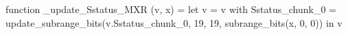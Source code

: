 function _update_Sstatus_MXR (v, x) = let v = { v with Sstatus_chunk_0 = update_subrange_bits(v.Sstatus_chunk_0, 19, 19, subrange_bits(x, 0, 0)) } in
  v
